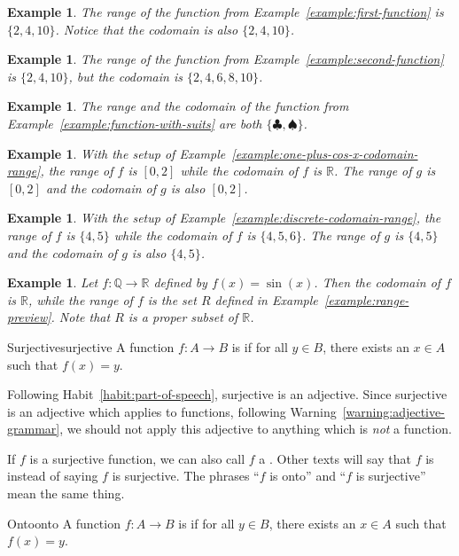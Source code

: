 \documentclass{book}
\newcounter{ekcounter}%
\theoremstyle{ekimcustom}
\newtheorem{example}[ekcounter]{Example}
\newcommand\defn[1]{{\color{blue}{\bf #1}}}
\begin{document}
\begin{example}
The range of the function from Example~\ref{example:first-function} is $\{2,4,10\}$. Notice that the codomain is also $\{2,4,10\}$.
\end{example}
\begin{example}
The range of the function from Example~\ref{example:second-function} is $\{2,4,10\}$, but the codomain is $\{2,4,6,8,10\}$.
\end{example}
\begin{example}
The range and the codomain of the function from Example~\ref{example:function-with-suits} are both $\{\clubsuit,\spadesuit\}$.
\end{example}
\begin{example}
With the setup of Example~\ref{example:one-plus-cos-x-codomain-range}, the range of $f$ is $[0,2]$ while the codomain of $f$ is $\mathbb{R}$. The range of $g$ is $[0,2]$ and the codomain of $g$ is also $[0,2]$.
\end{example}
\begin{example}
With the setup of Example~\ref{example:discrete-codomain-range}, the range of $f$ is $\{4,5\}$ while the codomain of $f$ is $\{4,5,6\}$. The range of $g$ is $\{4,5\}$ and the codomain of $g$ is also $\{4,5\}$.
\end{example}


\begin{example}
Let $f : \mathbb{Q} \to \mathbb{R}$ defined by $f(x) = \sin(x)$. Then the codomain of $f$ is $\mathbb{R}$, while the range of $f$ is the set $R$ defined in Example~\ref{example:range-preview}. Note that $R$ is a proper subset of $\mathbb{R}$.
\end{example}









\begin{bdefinition}{Surjective}{surjective}
A function $f : A \to B$ is \defn{surjective} if for all $y \in B$, there exists an $x \in A$ such that $f(x)=y$.
\end{bdefinition}
Following Habit~\ref{habit:part-of-speech}, surjective is an adjective. Since surjective is an adjective which applies to functions, following Warning~\ref{warning:adjective-grammar}, we should not apply this adjective to anything which is \emph{not} a function.

If $f$ is a surjective function, we can also call $f$ a \defn{surjection}. Other texts will say that $f$ is \defn{onto} instead of saying $f$ is surjective. The phrases ``$f$ is onto'' and ``$f$ is surjective'' mean the same thing.
\begin{bdefinition}{Onto}{onto}
A function $f : A \to B$ is \defn{onto} if for all $y \in B$, there exists an $x \in A$ such that $f(x)=y$.
\end{bdefinition}
\end{document}
